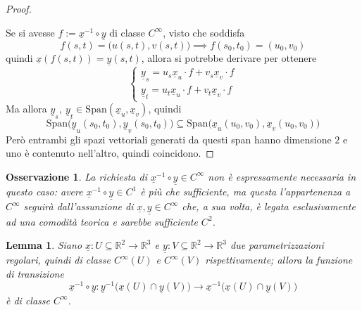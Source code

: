 \documentclass[12pt]{scrartcl}
\theoremstyle{style}
\newtheorem{lemma}{Lemma}[teorema]
\newtheorem{osservazione}{Osservazione}[section]
\numberwithin{equation}{subsection}
\begin{document}
\begin{proof}
\begin{center}
\begin{tikzpicture}[scale=1.1,>=Stealth]
\end{tikzpicture}
	\end{center}
Se si avesse $f := \underline{x}^{-1}\circ \underline{y}$ di classe $C^\infty$, visto che soddisfa
\[
f(s,t) = \big(u(s,t),v(s,t)\big)\implies f(s_0,t_0) = (u_0,v_0)
\] 
quindi $\underline{x} (f(s,t)) = \underline{y}(s,t)$, allora si potrebbe derivare per ottenere 
\[
\begin{cases}
	\underline{y}_s = u_s \underline{x}_u \cdot f + v_s \underline{x}_v \cdot f\\
	\underline{y}_t = u_t \underline{x}_u \cdot f + v_t \underline{x}_v \cdot f
\end{cases}
\] 
Ma allora $\underline{y}_s, \ \underline{y}_{t} \in \mathrm{Span} (\underline{x}_u,\underline{x}_v)  $, quindi
\[
 \mathrm{Span} \big(\underline{y}_u(s_0,t_0),\underline{y}_v(s_0,t_0)\big) \subseteq \mathrm{Span} \big(\underline{x}_u(u_0,v_0),\underline{x}_v(u_0,v_0)\big) 
\] 
Per\`o entrambi gli spazi vettoriali generati da questi span hanno dimensione $2$ e uno \`e contenuto nell'altro, quindi coincidono.
\end{proof}
\begin{osservazione}
La richiesta di $\underline{x}^{-1}\circ \underline{y} \in C^\infty$ non \`e espressamente necessaria in questo caso: avere $\underline{x}^{-1}\circ \underline{y} \in C^1$ \`e pi\`u che sufficiente, ma questa l'appartenenza a $C^\infty$ seguir\`a dall'assunzione di $\underline{x}, \underline{y}\in C^\infty$ che, a sua volta, \`e legata esclusivamente ad una comodit\`a teorica e sarebbe sufficiente $C^2$.
\end{osservazione}
\begin{lemma}
	Siano $\underline{x} : U \subseteq \mathbb{R}^2 \to \mathbb{R}^3$ e $\underline{y} : V \subseteq \mathbb{R}^2 \to \mathbb{R}^3$ due parametrizzazioni regolari, quindi di classe $C^\infty(U)$ e $C^\infty(V)$ rispettivamente; allora la \textit{funzione di transizione} 
	\[
	\underline{x}^{-1}\circ \underline{y} : \underline{y}^{-1}\big(\underline{x}(U) \cap \underline{y}(V)\big) \longrightarrow \underline{x}^{-1}\big(\underline{x}(U) \cap \underline{y}(V)\big)
	\] 
	\`e di classe $C^\infty$.
\end{lemma}
\end{document}
